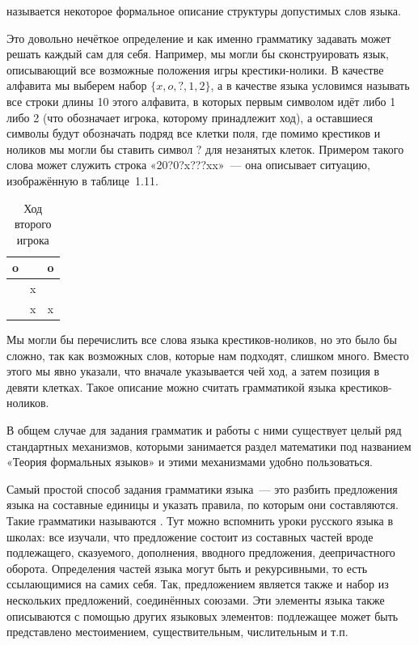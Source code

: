 \begin{definition}
 называется некоторое формальное описание структуры допустимых слов языка.
\end{definition}

Это довольно нечёткое определение и как именно грамматику задавать может решать каждый сам для себя. Например, мы могли бы сконструировать язык, описывающий все возможные положения игры крестики-нолики. В качестве алфавита мы выберем набор $\{x, o, ?,1, 2\}$, а в качестве языка условимся называть все строки длины 10 этого алфавита, в которых первым символом идёт либо 1 либо 2 (что обозначает игрока, которому принадлежит ход), а оставшиеся символы будут обозначать подряд все клетки поля, где помимо крестиков и ноликов мы могли бы ставить символ $?$ для незанятых клеток. Примером такого слова может служить строка «20?0?x???xx»~— она описывает ситуацию, изображённую в таблице~1.11.

\begin{table}[h]
\centering
\begin{tabular}{c | c | c}
o & & o\\
\hline
  & x & \\
\hline
 & x & x
\end{tabular}
\caption{Ход второго игрока}
\end{table}

Мы могли бы перечислить все слова языка крестиков-ноликов, но это было бы сложно, так как возможных слов, которые нам подходят, слишком много. Вместо этого мы явно указали, что вначале указывается чей ход, а затем позиция в девяти клетках. Такое описание можно считать грамматикой языка крестиков-ноликов.

В общем случае для задания грамматик и работы с ними существует целый ряд стандартных механизмов, которыми занимается раздел математики под названием «Теория формальных языков» и этими механизмами удобно пользоваться.

Самый простой способ задания грамматики языка~— это разбить предложения языка на составные единицы и указать правила, по которым они составляются. Такие грамматики называются . Тут можно вспомнить уроки русского языка в школах: все изучали, что предложение состоит из составных частей вроде подлежащего, сказуемого, дополнения, вводного предложения, деепричастного оборота. Определения частей языка могут быть и рекурсивными, то есть ссылающимися на самих себя. Так, предложением является также и набор из нескольких предложений, соединённых союзами. Эти элементы языка также описываются с помощью других языковых элементов: подлежащее может быть представлено местоимением, существительным, числительным и т.п.

